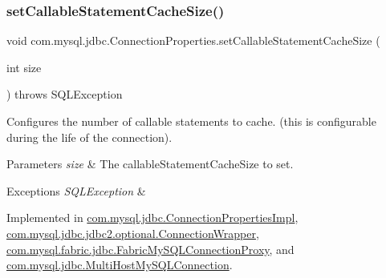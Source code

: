 \subsubsection{\texorpdfstring{set\+Callable\+Statement\+Cache\+Size()}{setCallableStatementCacheSize()}}
{\footnotesize\ttfamily void com.\+mysql.\+jdbc.\+Connection\+Properties.\+set\+Callable\+Statement\+Cache\+Size (\begin{DoxyParamCaption}\item[{int}]{size }\end{DoxyParamCaption}) throws S\+Q\+L\+Exception}

Configures the number of callable statements to cache. (this is configurable during the life of the connection).


\begin{DoxyParams}{Parameters}
{\em size} & The callable\+Statement\+Cache\+Size to set. \\
\hline
\end{DoxyParams}

\begin{DoxyExceptions}{Exceptions}
{\em S\+Q\+L\+Exception} & \\
\hline
\end{DoxyExceptions}


Implemented in \mbox{\hyperlink{classcom_1_1mysql_1_1jdbc_1_1_connection_properties_impl_afe4c2a741e7dcb6d5e155e91a433af64}{com.\+mysql.\+jdbc.\+Connection\+Properties\+Impl}}, \mbox{\hyperlink{classcom_1_1mysql_1_1jdbc_1_1jdbc2_1_1optional_1_1_connection_wrapper_a8e6ffb0bce5a7d16da96043683ec3f18}{com.\+mysql.\+jdbc.\+jdbc2.\+optional.\+Connection\+Wrapper}}, \mbox{\hyperlink{classcom_1_1mysql_1_1fabric_1_1jdbc_1_1_fabric_my_s_q_l_connection_proxy_a8100b9d5f43092c2ee27155fbf94295e}{com.\+mysql.\+fabric.\+jdbc.\+Fabric\+My\+S\+Q\+L\+Connection\+Proxy}}, and \mbox{\hyperlink{classcom_1_1mysql_1_1jdbc_1_1_multi_host_my_s_q_l_connection_a738d6bb9fa72c912b24fa0fb9d978af9}{com.\+mysql.\+jdbc.\+Multi\+Host\+My\+S\+Q\+L\+Connection}}.

